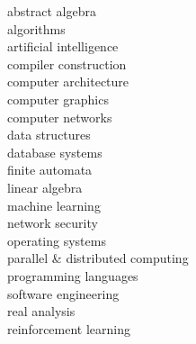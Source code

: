 \begin{minipage}[t]{0.33\textwidth}
abstract algebra \\
algorithms \\
artificial intelligence\\
compiler construction\\
computer architecture \\
computer graphics \\
computer networks \\
data structures \\
database systems \\
finite automata \\
linear algebra \\
machine learning \\
network security \\
operating systems \\
parallel \& distributed computing \\
programming languages \\ 
software engineering \\
real analysis\\
reinforcement learning\\



\sectionspace






\end{minipage} %
\hfill
%
